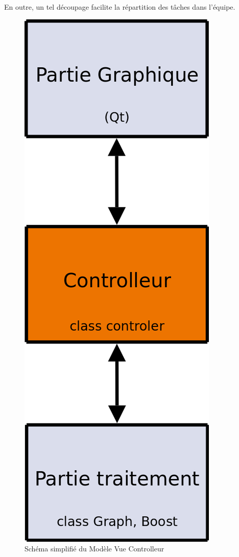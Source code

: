 En outre, un tel découpage facilite la répartition des tâches dans l'équipe.

\begin{figure}[H]
\begin{center}
        \includegraphics[height=0.3\textheight]{./schema/mvcScheme.png}
\caption{Schéma simplifié du Modèle Vue Controlleur}
\label{mvc}
\end{center}
\end{figure}

